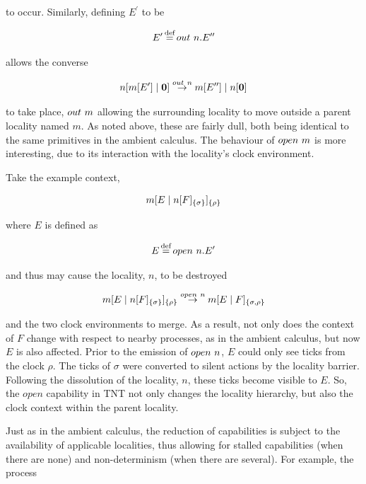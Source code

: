 \noindent to occur.  Similarly, defining $E^\prime$ to be

\begin{equation}
E^\prime \operatorname{\stackrel{\textrm{def}}{=}} out\ n.E^{\prime\prime}
\end{equation}

\noindent allows the converse

\begin{equation}
{n}[ {m}[ E^\prime ]\;|\;\textbf{0} ] \stackrel{out\ n}{\rightarrow}
{m}[ E^{\prime\prime} ]\;|\;{n}[ \textbf{0} ]
\end{equation}

\noindent to take place, $out\ m$ allowing the surrounding locality
to move outside a parent locality named $m$.  As noted above, these are
fairly dull, both being identical to the same primitives in the ambient
calculus.  The behaviour of $open\ m$ is more interesting, due to
its interaction with the locality's clock environment.

Take the example context,

\begin{equation}
{m}[ E\;|\;{n}[ F ]_{\{\sigma\}} ]_{\{\rho\}}
\end{equation}

\noindent where $E$ is defined as

\begin{equation}
E \operatorname{\stackrel{\textrm{def}}{=}} open\ n.E^\prime
\end{equation}

\noindent and thus may cause the locality, $n$, to be destroyed

\begin{equation}
{m}[ E\;|\;{n}[ F ]_{\{\sigma\}} ]_{\{\rho\}} \stackrel{open\ n}{\rightarrow}
{m}[ E\;|\;F ]_{\{\sigma, \rho\}}
\end{equation}

\noindent and the two clock environments to merge.  As a result, not
only does the context of $F$ change with respect to nearby processes, as
in the ambient calculus, but now $E$ is also affected.  Prior to the
emission of $open\ n$, $E$ could only see ticks from the clock
$\rho$.  The ticks of $\sigma$ were converted to silent actions by the
locality barrier.  Following the dissolution of the locality, $n$, these
ticks become visible to $E$.  So, the $open$ capability in TNT not only
changes the locality hierarchy, but also the clock context within the
parent locality.

Just as in the ambient calculus, the reduction of capabilities is
subject to the availability of applicable localities, thus allowing for
stalled capabilities (when there are none) and non-determinism (when
there are several). For example, the process

